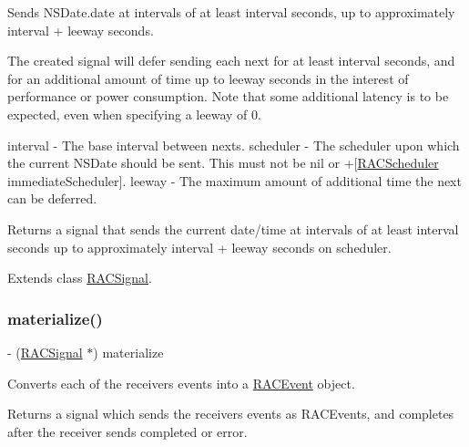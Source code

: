 Sends N\+S\+Date.\+date at intervals of at least {\ttfamily interval} seconds, up to approximately {\ttfamily interval} + {\ttfamily leeway} seconds.

The created signal will defer sending each {\ttfamily next} for at least {\ttfamily interval} seconds, and for an additional amount of time up to {\ttfamily leeway} seconds in the interest of performance or power consumption. Note that some additional latency is to be expected, even when specifying a {\ttfamily leeway} of 0.

interval -\/ The base interval between {\ttfamily next}s. scheduler -\/ The scheduler upon which the current N\+S\+Date should be sent. This must not be nil or +\mbox{[}\mbox{\hyperlink{interface_r_a_c_scheduler}{R\+A\+C\+Scheduler}} immediate\+Scheduler\mbox{]}. leeway -\/ The maximum amount of additional time the {\ttfamily next} can be deferred.

Returns a signal that sends the current date/time at intervals of at least {\ttfamily interval seconds} up to approximately {\ttfamily interval} + {\ttfamily leeway} seconds on {\ttfamily scheduler}. 

Extends class \mbox{\hyperlink{interface_r_a_c_signal_acd968c129ec1afe3b5bc77db5fc13291}{R\+A\+C\+Signal}}.

\mbox{\label{category_r_a_c_signal_07_operations_08_a2b970ec1845b139478ba31f00fe34b71}} 
\subsubsection{\texorpdfstring{materialize()}{materialize()}\hspace{0.1cm}{\footnotesize\ttfamily [1/3]}}
{\footnotesize\ttfamily -\/ (\mbox{\hyperlink{interface_r_a_c_signal}{R\+A\+C\+Signal}} $\ast$) materialize \begin{DoxyParamCaption}{ }\end{DoxyParamCaption}}

Converts each of the receiver\textquotesingle{}s events into a \mbox{\hyperlink{interface_r_a_c_event}{R\+A\+C\+Event}} object.

Returns a signal which sends the receiver\textquotesingle{}s events as R\+A\+C\+Events, and completes after the receiver sends {\ttfamily completed} or {\ttfamily error}. 

